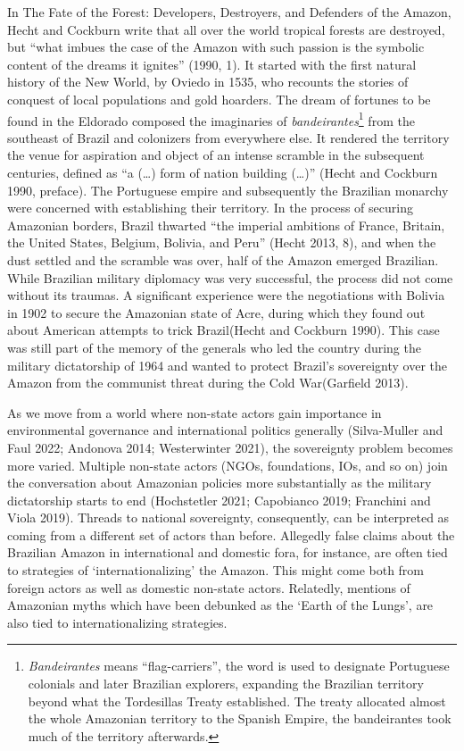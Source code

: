 \documentclass[
]{article}
\begin{document}
In The Fate of the Forest: Developers, Destroyers, and Defenders of the
Amazon, Hecht and Cockburn write that all over the world tropical
forests are destroyed, but ``what imbues the case of the Amazon with
such passion is the symbolic content of the dreams it ignites'' (1990,
1). It started with the first natural history of the New World, by
Oviedo in 1535, who recounts the stories of conquest of local
populations and gold hoarders. The dream of fortunes to be found in the
Eldorado composed the imaginaries of \emph{bandeirantes}\footnote{\emph{Bandeirantes}
  means ``flag-carriers'', the word is used to designate Portuguese
  colonials and later Brazilian explorers, expanding the Brazilian
  territory beyond what the Tordesillas Treaty established. The treaty
  allocated almost the whole Amazonian territory to the Spanish Empire,
  the bandeirantes took much of the territory afterwards.} from the
southeast of Brazil and colonizers from everywhere else. It rendered the
territory the venue for aspiration and object of an intense scramble in
the subsequent centuries, defined as ``a (\ldots) form of nation
building (\ldots)'' (Hecht and Cockburn 1990, preface). The Portuguese
empire and subsequently the Brazilian monarchy were concerned with
establishing their territory. In the process of securing Amazonian
borders, Brazil thwarted ``the imperial ambitions of France, Britain,
the United States, Belgium, Bolivia, and Peru'' (Hecht 2013, 8), and
when the dust settled and the scramble was over, half of the Amazon
emerged Brazilian. While Brazilian military diplomacy was very
successful, the process did not come without its traumas. A significant
experience were the negotiations with Bolivia in 1902 to secure the
Amazonian state of Acre, during which they found out about American
attempts to trick Brazil(Hecht and Cockburn 1990). This case was still
part of the memory of the generals who led the country during the
military dictatorship of 1964 and wanted to protect Brazil's sovereignty
over the Amazon from the communist threat during the Cold War(Garfield
2013).

As we move from a world where non-state actors gain importance in
environmental governance and international politics generally
(Silva-Muller and Faul 2022; Andonova 2014; Westerwinter 2021), the
sovereignty problem becomes more varied. Multiple non-state actors
(NGOs, foundations, IOs, and so on) join the conversation about
Amazonian policies more substantially as the military dictatorship
starts to end (Hochstetler 2021; Capobianco 2019; Franchini and Viola
2019). Threads to national sovereignty, consequently, can be interpreted
as coming from a different set of actors than before. Allegedly false
claims about the Brazilian Amazon in international and domestic fora,
for instance, are often tied to strategies of `internationalizing' the
Amazon. This might come both from foreign actors as well as domestic
non-state actors. Relatedly, mentions of Amazonian myths which have been
debunked as the `Earth of the Lungs', are also tied to
internationalizing strategies.
\end{document}
